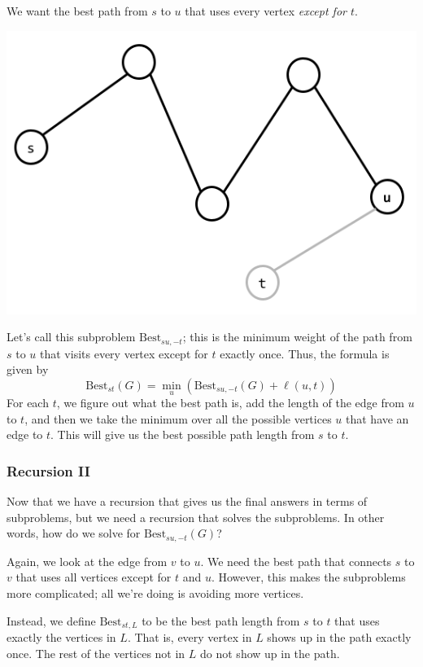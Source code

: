 \documentclass[letterpaper]{article}
\begin{document}
We want the best path from $s$ to $u$ that uses every vertex \emph{except for $t$}. 
\begin{center}
    \includegraphics[scale=0.4]{assets/st_path_3.png}
\end{center}
Let's call this subproblem $\text{Best}_{su, -t}$; this is the minimum weight of the path from $s$ to $u$ that visits every vertex except for $t$ exactly once. Thus, the formula is given by 
\[\text{Best}_{st}(G) = \min_{u} \left(\text{Best}_{su, -t}(G) + \ell(u, t)\right)\]
For each $t$, we figure out what the best path is, add the length of the edge from $u$ to $t$, and then we take the minimum over all the possible vertices $u$ that have an edge to $t$. This will give us the best possible path length from $s$ to $t$. 

\subsubsection{Recursion II}
Now that we have a recursion that gives us the final answers in terms of subproblems, but we need a recursion that solves the subproblems. In other words, how do we solve for $\text{Best}_{su, -t}(G)$? 

\bigskip 

Again, we look at the edge from $v$ to $u$. We need the best path that connects $s$ to $v$ that uses all vertices except for $t$ and $u$. However, this makes the subproblems more complicated; all we're doing is avoiding more vertices. 

\bigskip 

Instead, we define $\text{Best}_{st, L}$ to be the best path length from $s$ to $t$ that uses exactly the vertices in $L$. That is, every vertex in $L$ shows up in the path exactly once. The rest of the vertices not in $L$ do not show up in the path. 
\end{document}
